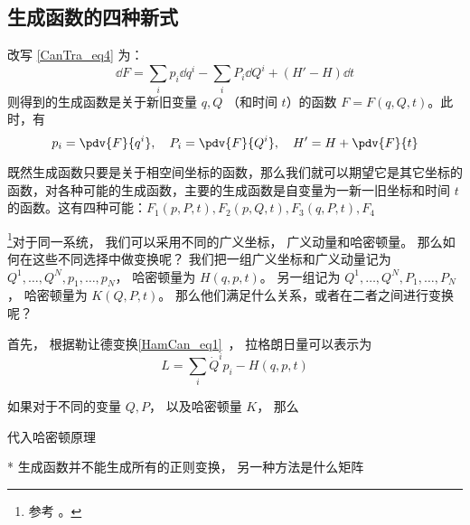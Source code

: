 \subsection{生成函数的四种新式}
改写 \autoref{CanTra_eq4} 为：
\begin{equation}
\dd F=\sum_ip_i\dd q^i-\sum_iP_i\dd Q^i+(H'-H)\dd t
\end{equation}
则得到的生成函数是关于新旧变量 $q,Q$ （和时间 $t$）的函数 $F=F(q,Q,t)$。此时，有
\begin{equation}
p_i=\pdv{F}{q^i},\quad P_i=\pdv{F}{Q^i},\quad H'=H+\pdv{F}{t}
\end{equation}

既然生成函数只要是关于相空间坐标的函数，那么我们就可以期望它是其它坐标的函数，对各种可能的生成函数，主要的生成函数是自变量为一新一旧坐标和时间 $t$ 的函数。这有四种可能：$F_1(p,P,t),F_2(p,Q,t),F_3(q,P,t),F_4$




\footnote{参考 \cite{Goldstein}。}对于同一系统， 我们可以采用不同的广义坐标， 广义动量和哈密顿量。 那么如何在这些不同选择中做变换呢？ 我们把一组广义坐标和广义动量记为 $Q^1,\dots, Q^N, p_1, \dots, p_N$， 哈密顿量为 $H(q, p, t)$。 另一组记为 $Q^1,\dots, Q^N, P_1, \dots, P_N$， 哈密顿量为 $K(Q, P, t)$。 那么他们满足什么关系，或者在二者之间进行变换呢？

首先， 根据勒让德变换\autoref{HamCan_eq1}~， 拉格朗日量可以表示为
\begin{equation}
L = \sum_i \dot Q^i p_i - H(q, p, t)
\end{equation}

如果对于不同的变量 $Q, P$， 以及哈密顿量 $K$， 那么

代入哈密顿原理

* 生成函数并不能生成所有的正则变换， 另一种方法是什么矩阵

